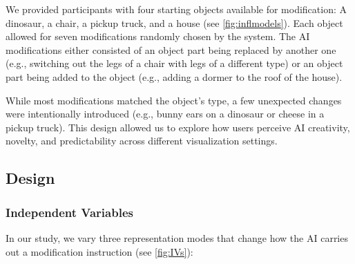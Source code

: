 We provided participants with four starting objects available for modification: A dinosaur, a chair, a pickup truck, and a house (see \autoref{fig:inflmodels}). %
Each object allowed for seven modifications randomly chosen by the system.
The AI modifications either consisted of an object part being replaced by another one (e.g., switching out the legs of a chair with legs of a different type) or an object part being added to the object (e.g., adding a dormer to the roof of the house).

While most modifications matched the object's type, a few unexpected changes were intentionally introduced (e.g., bunny ears on a dinosaur or cheese in a pickup truck). 
This design allowed us to explore how users perceive AI creativity, novelty, and predictability across different visualization settings.

\subsection{Design}

\subsubsection{Independent Variables}
In our study, we vary three representation modes that change how the AI carries out a modification instruction (see \autoref{fig:IVs}):

